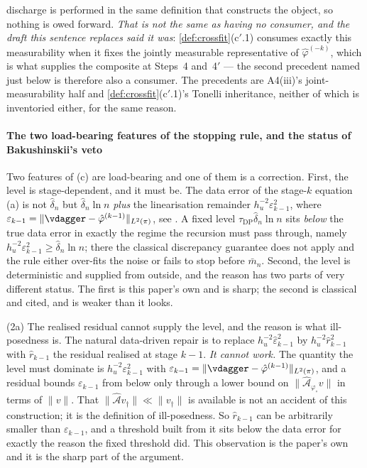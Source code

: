 discharge is performed in the same definition that constructs the object, so nothing is owed forward.
\emph{That is not the same as having no consumer, and the draft this sentence replaces said it
was}: \cref{def:crossfit}\textup{(c$'$.1)} consumes exactly this measurability when it fixes the
jointly measurable representative of $\hat\varphi^{(-k)}$, which is what supplies the composite at
 Steps~4 and~4$'$ --- the second precedent named just below is therefore
also a consumer. The precedents are A4(iii)'s joint-measurability half and
\cref{def:crossfit}\textup{(c$'$.1)}'s Tonelli inheritance, neither of which is inventoried either, for the
same reason.

\paragraph{The two load-bearing features of the stopping rule, and the status of Bakushinskii's veto}

Two features of (c) are load-bearing and one of them is a correction. First, the level is
stage-dependent, and it must be. The data error of the stage-$k$ equation (a) is not $\hat\delta_n$
but $\hat\delta_n\ln n$ \emph{plus} the linearisation remainder $h_u^{-2}\varepsilon_{k-1}^{2}$, where
$\varepsilon_{k-1}=\|\vdagger-\hat\varphi^{(k-1)}\|_{L^{2}(\pi)}$, see . A
fixed level $\tau_{\mathrm{DP}}\hat\delta_n\ln n$ sits
\emph{below} the true data error in exactly the regime the recursion must pass through, namely
$h_u^{-2}\varepsilon_{k-1}^{2}\ge\hat\delta_n\ln n$; there the classical discrepancy guarantee does not
apply and the rule either over-fits the noise or fails to stop before $\bar m_n$.
Second, the level is deterministic and supplied from outside, and the reason has two parts of
very different status. The first is this paper's own and is sharp; the second is classical and cited,
and is weaker than it looks.

(2a) The realised residual cannot supply the level, and the reason is what ill-posedness is. The
natural data-driven repair is to replace $h_u^{-2}\hat\varepsilon_{k-1}^{2}$ by
$h_u^{-2}\hat r_{k-1}^{2}$ with $\hat r_{k-1}$ the residual realised at stage $k-1$. \emph{It cannot
work.} The quantity the level must dominate is $h_u^{-2}\varepsilon_{k-1}^{2}$ with
$\varepsilon_{k-1}=\|\vdagger-\hat\varphi^{(k-1)}\|_{L^{2}(\pi)}$, and a residual bounds $\varepsilon_{k-1}$
from below only through a lower bound on $\|\hat{\mathcal A}_{\varphi_\circ}v\|$ in terms of $\|v\|$.
That $\|\hat{\mathcal A}v_\dagger\|\ll\|v_\dagger\|$ is available is not an accident of this
construction; it is the definition of ill-posedness. So $\hat r_{k-1}$ can be arbitrarily smaller than
$\varepsilon_{k-1}$, and a threshold built from it sits below the data error for exactly the reason the
fixed threshold did. This observation is the paper's own and it is the sharp part of the
argument.


